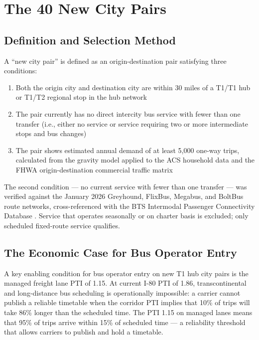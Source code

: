 \section{The 40 New City Pairs}

\subsection{Definition and Selection Method}

A ``new city pair'' is defined as an origin-destination pair satisfying three conditions:
\begin{enumerate}
  \item Both the origin city and destination city are within 30 miles of a T1/T1 hub or T1/T2 regional stop in the hub network
  \item The pair currently has no direct intercity bus service with fewer than one transfer (i.e., either no service or service requiring two or more intermediate stops and bus changes)
  \item The pair shows estimated annual demand of at least 5,000 one-way trips, calculated from the gravity model applied to the ACS household data and the FHWA origin-destination commercial traffic matrix \citep{ACS_B08201_2022,FHWA_freight2023}
\end{enumerate}

The second condition --- no current service with fewer than one transfer --- was verified against the January 2026 Greyhound, FlixBus, Megabus, and BoltBus route networks, cross-referenced with the BTS Intermodal Passenger Connectivity Database \citep{BTS_intermodal2023}. Service that operates seasonally or on charter basis is excluded; only scheduled fixed-route service qualifies.

\subsection{The Economic Case for Bus Operator Entry}

A key enabling condition for bus operator entry on new T1 hub city pairs is the managed freight lane PTI of 1.15. At current I-80 PTI of 1.86, transcontinental and long-distance bus scheduling is operationally impossible: a carrier cannot publish a reliable timetable when the corridor PTI implies that 10\% of trips will take 86\% longer than the scheduled time. The PTI 1.15 on managed lanes means that 95\% of trips arrive within 15\% of scheduled time --- a reliability threshold that allows carriers to publish and hold a timetable.

